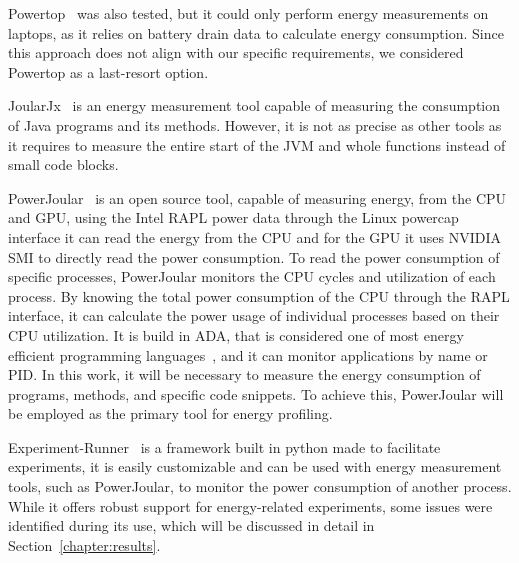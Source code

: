 Powertop~\cite{archlinux_powertop} was also tested, but it could only perform energy measurements on laptops, as it relies on battery drain data to calculate energy consumption. Since this approach does not align with our specific requirements, we considered Powertop as a last-resort option.

JoularJx~\cite{noureddine-ie-2022} is an energy measurement tool capable of measuring the consumption of Java programs and its methods. However, it is not as precise as other tools as it requires to measure the entire start of the JVM and whole functions instead of small code blocks.


PowerJoular~\cite{noureddine-ie-2022} is an open source tool, capable of measuring energy, from the CPU and GPU, using the Intel RAPL power data through the Linux powercap interface it can read the energy from the CPU and for the GPU it uses NVIDIA SMI to directly read the power consumption.
To read the power consumption of specific processes, PowerJoular monitors the CPU cycles and utilization of each process. By knowing the total power consumption of the CPU through the RAPL interface, it can calculate the power usage of individual processes based on their CPU utilization.
It is build in ADA, that is considered one of most energy efficient programming languages~\cite{PEREIRA2021102609}, and it can monitor applications by name or PID. In this work, it will be necessary to measure the energy consumption of programs, methods, and specific code snippets. To achieve this, PowerJoular will be employed as the primary tool for energy profiling.

Experiment-Runner~\cite{S2_Group_Experiment_Runner} is a framework built in python made to facilitate experiments, it is easily customizable and can be used with energy measurement tools, such as PowerJoular, to monitor the power consumption of another process. While it offers robust support for energy-related experiments, some issues were identified during its use, which will be discussed in detail in Section~\ref{chapter:results}.

